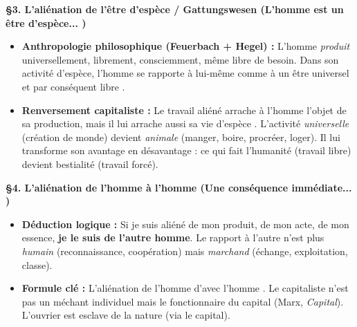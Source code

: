 \documentclass[11pt]{article}
\begin{document}
\begin{corrige}
\textbf{§3. L'aliénation de l'être d'espèce / Gattungswesen (\guillemotleft L'homme est un être d'espèce... \guillemotright)}
\begin{itemize}
\item \textbf{Anthropologie philosophique (Feuerbach + Hegel) :} L'homme \emph{produit} universellement, librement, consciemment, même libre de besoin. \guillemotleft Dans son activité d'espèce, l'homme se rapporte à lui-même comme à un être universel et par conséquent libre \guillemotright.
\item \textbf{Renversement capitaliste :} \guillemotleft Le travail aliéné arrache à l'homme l'objet de sa production, mais il lui arrache aussi sa vie d'espèce \guillemotright. L'activité \emph{universelle} (création de monde) devient \emph{animale} (manger, boire, procréer, loger). \guillemotleft Il lui transforme son avantage en désavantage \guillemotright : ce qui fait l'humanité (travail libre) devient bestialité (travail forcé).
\end{itemize}

\textbf{§4. L'aliénation de l'homme à l'homme (\guillemotleft Une conséquence immédiate... \guillemotright)}
\begin{itemize}
\item \textbf{Déduction logique :} Si je suis aliéné de mon produit, de mon acte, de mon essence, \textbf{je le suis de l'autre homme}. Le rapport à l'autre n'est plus \emph{humain} (reconnaissance, coopération) mais \emph{marchand} (échange, exploitation, classe).
\item \textbf{Formule clé :} \guillemotleft L'aliénation de l'homme d'avec l'homme \guillemotright. Le capitaliste n'est pas un \guillemotleft méchant \guillemotright individuel mais le \guillemotleft fonctionnaire du capital \guillemotright (Marx, \emph{Capital}). L'ouvrier est \guillemotleft esclave de la nature \guillemotright (via le capital).
\end{itemize}


\end{corrige}
\end{document}
